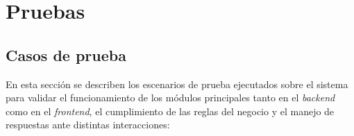 \documentclass[12pt, atypical, journal]{article}
\begin{document}
\newpage
\section{Pruebas}

\subsection{Casos de prueba}
En esta sección se describen los escenarios de prueba ejecutados sobre el sistema para validar el funcionamiento de los módulos principales tanto en el \textit{backend} como en el \textit{frontend}, el cumplimiento de las reglas del negocio y el manejo de respuestas ante distintas interacciones:
\end{document}
